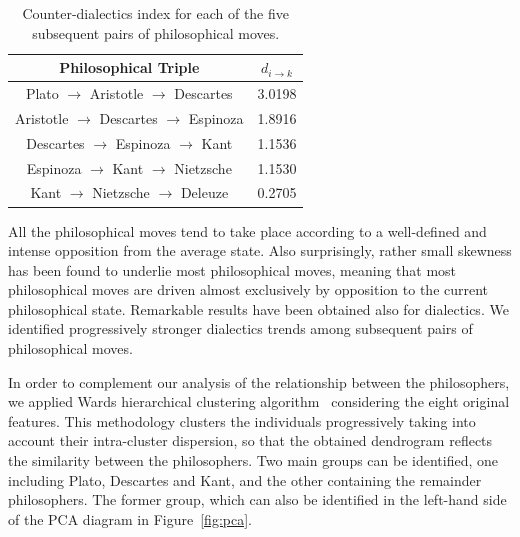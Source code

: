 \documentclass[%
 aip,
 jmp,%
 amsmath,amssymb,
 reprint,%
]{revtex4-1}
\begin{document}
\begin{table}%
\caption{\label{tab:tableE} Counter-dialectics index for each
of the five subsequent pairs of philosophical moves.  }

\begin{tabular}{|c||c|}
\hline
Philosophical Triple & $d_{i \rightarrow k}$ \\
\hline \hline
Plato $\rightarrow$ Aristotle $\rightarrow$ Descartes    & 3.0198 \\
Aristotle $\rightarrow$ Descartes $\rightarrow$ Espinoza & 1.8916 \\
Descartes $\rightarrow$ Espinoza $\rightarrow$ Kant      & 1.1536 \\
Espinoza $\rightarrow$ Kant $\rightarrow$ Nietzsche      & 1.1530 \\
Kant $\rightarrow$ Nietzsche $\rightarrow$ Deleuze       & 0.2705 \\
\hline
\end{tabular}
\end{table}

All the philosophical moves tend to take place according to a
well-defined and intense opposition from the average state.  Also
surprisingly, rather small skewness has been found to underlie most
philosophical moves, meaning that most philosophical moves are driven
almost exclusively by opposition to the current philosophical state.
Remarkable results have been obtained also for dialectics.  We
identified progressively stronger dialectics trends among subsequent
pairs of philosophical moves.

In order to complement our analysis of the relationship between the
philosophers, we applied Wards hierarchical clustering
algorithm~\cite{Duda,Costa} considering the eight original features.
This methodology clusters the individuals progressively taking into
account their intra-cluster dispersion, so that the obtained
dendrogram reflects the similarity between the philosophers.  Two main
groups can be identified, one including Plato, Descartes and Kant, and
the other containing the remainder philosophers.  The former group,
which can also be identified in the left-hand side of the PCA diagram
in Figure~\ref{fig:pca}.
\end{document}
